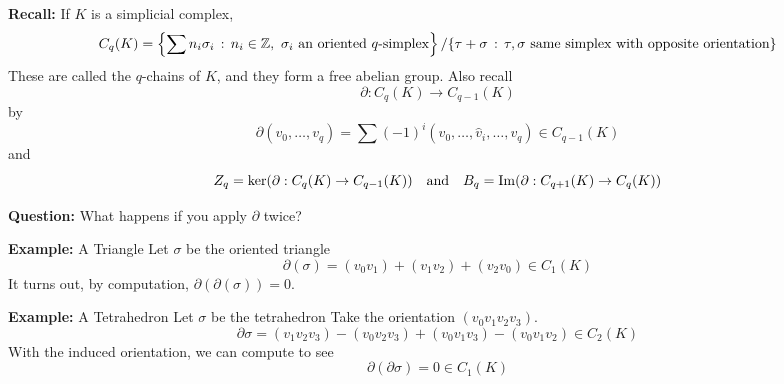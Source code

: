 

\textbf{Recall:} If $K$ is a simplicial complex,
\[ C_q(K) = \left\{\sum n_i\sigma_i \, :\, n_i \in \mathbb{Z},\ \sigma_i \text{ an oriented } q\text{-simplex}\right\} / \{\tau + \sigma \, :\, \tau, \sigma \text{ same simplex with opposite orientation}\} \]
These are called the $q$-chains of $K$, and they form a free abelian group. Also recall
\[ \partial : C_q(K) \to C_{q - 1}(K) \]
by
\[ \partial(v_0, \ldots, v_q) = \sum (-1)^{i}(v_0, \ldots, \widehat{v}_i, \ldots, v_q) \in C_{q - 1}(K) \]
and
\[ Z_q = \ker(\partial : C_q(K) \to C_{q - 1}(K)) \quad \text{and} \quad B_q = \operatorname{Im}(\partial : C_{q + 1}(K) \to C_q(K)) \]

\textbf{Question:} What happens if you apply $\partial$ twice?

\begin{example}{\textbf{Example:} A Triangle}
    Let $\sigma$ be the oriented triangle
    \[ \partial(\sigma) = (v_0v_1) + (v_1v_2) + (v_2v_0) \in C_1(K) \]
    It turns out, by computation, $\partial(\partial(\sigma)) = 0$.
\end{example}

\begin{example}{\textbf{Example:} A Tetrahedron}
    Let $\sigma$ be the tetrahedron
    Take the orientation $(v_0v_1v_2v_3)$.
    \[ \partial\sigma = (v_1v_2v_3) - (v_0v_2v_3) + (v_0v_1v_3) - (v_0v_1v_2) \in C_2(K) \]
    With the induced orientation, we can compute to see
    \[ \partial(\partial\sigma) = 0 \in C_1(K) \]
\end{example}

